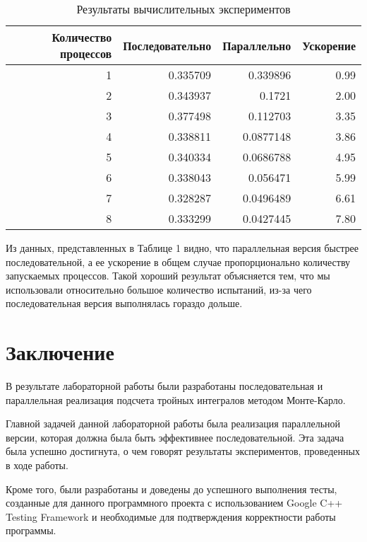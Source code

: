 \documentclass{report}
\begin{document}
\begin{table}[!h]
\caption{Результаты вычислительных экспериментов}
\centering
\begin{tabular}{| r | r | r | r |}
\hline
Количество процессов & Последовательно & Параллельно & Ускорение  \\[5pt]
\hline
1        & 0.335709        & 0.339896     & 0.99       \\
2        & 0.343937        & 0.1721     & 2.00       \\
3        & 0.377498        & 0.112703     & 3.35       \\
4        & 0.338811        & 0.0877148     & 3.86       \\
5        & 0.340334        & 0.0686788     & 4.95       \\
6        & 0.338043        & 0.056471     & 5.99       \\
7        & 0.328287        & 0.0496489     & 6.61	    \\
8        & 0.333299        & 0.0427445     & 7.80	  \\
\hline
\end{tabular}
\end{table}

\par Из данных, представленных в Таблице 1 видно, что параллельная версия быстрее последовательной, а ее ускорение в общем случае пропорционально количеству запускаемых процессов. Такой хороший результат объясняется тем, что мы использовали относительно большое количество испытаний, из-за чего последовательная версия выполнялась гораздо дольше.
\newpage

\section*{Заключение}
В результате лабораторной работы были разработаны последовательная и параллельная реализация подсчета тройных интегралов методом Монте-Карло.
\par Главной задачей данной лабораторной работы была реализация параллельной версии, которая должна была быть эффективнее последовательной. Эта задача была успешно достигнута, о чем говорят результаты экспериментов, проведенных в ходе работы.
\par Кроме того, были разработаны и доведены до успешного выполнения тесты, созданные для данного программного проекта с использованием Google C++ Testing Framework и необходимые для подтверждения корректности работы программы.
\newpage
\end{document}
